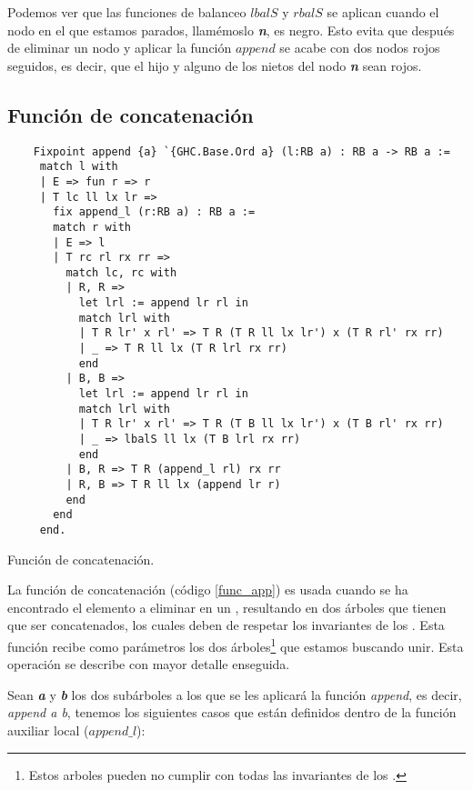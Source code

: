 Podemos ver que las funciones de balanceo \hyperref[lbalS]{$lbalS$} y \hyperref[lbalS]{$rbalS$} se 
aplican cuando el nodo en el que estamos parados, llamémoslo \textbf{\textit{n}}, es negro. Esto 
evita que después de eliminar un nodo y aplicar la funci\'on \hyperref[func_app]{$append$} se acabe 
con dos nodos rojos seguidos, es decir, que el hijo y alguno de los nietos del nodo 
\textbf{\textit{n}} sean rojos.

\subsection{Funci\'on de concatenaci\'on}

\begin{listing}[!ht]
    \centering
    \captionsetup{justification=centering}
    \begin{verbatim}
    Fixpoint append {a} `{GHC.Base.Ord a} (l:RB a) : RB a -> RB a :=
     match l with
     | E => fun r => r
     | T lc ll lx lr =>
       fix append_l (r:RB a) : RB a :=
       match r with
       | E => l
       | T rc rl rx rr =>
         match lc, rc with
         | R, R =>
           let lrl := append lr rl in
           match lrl with
           | T R lr' x rl' => T R (T R ll lx lr') x (T R rl' rx rr)
           | _ => T R ll lx (T R lrl rx rr)
           end
         | B, B =>
           let lrl := append lr rl in
           match lrl with
           | T R lr' x rl' => T R (T B ll lx lr') x (T B rl' rx rr)
           | _ => lbalS ll lx (T B lrl rx rr)
           end
         | B, R => T R (append_l rl) rx rr
         | R, B => T R ll lx (append lr r)
         end
       end
     end.
    \end{verbatim}
    \caption{Funci\'on de concatenaci\'on.}
    \label{func_app}
    \end{listing}

La funci\'on de concatenación (c\'odigo \ref{func_app}) es usada cuando se ha encontrado el elemento a 
eliminar en un {\arn}, resultando en dos \'arboles que tienen que ser concatenados, los cuales deben 
de respetar los invariantes de los {\arns}. Esta funci\'on recibe como parámetros los dos 
\'arboles\footnote{Estos arboles pueden no cumplir con todas las invariantes de los {\arns}.} que 
estamos buscando unir. Esta operación se describe con mayor detalle enseguida.

Sean \textbf{\textit{a}} y \textbf{\textit{b}} los dos subárboles a los que se les aplicar\'a la 
funci\'on \emph{append}, es decir, \textit{append a b}, tenemos los siguientes casos que están definidos 
dentro de la funci\'on auxiliar local ($append\_l$):

